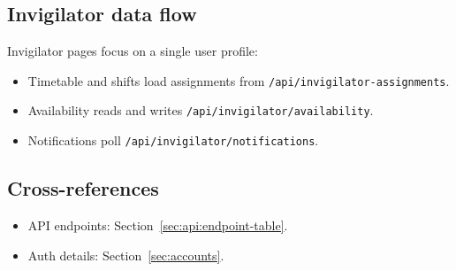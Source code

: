 \subsection{Invigilator data flow}
\label{subsec:frontend:state:invigilator}

Invigilator pages focus on a single user profile:

\begin{itemize}
  \item Timetable and shifts load assignments from \texttt{/api/invigilator-assignments}.
  \item Availability reads and writes \texttt{/api/invigilator/availability}.
  \item Notifications poll \texttt{/api/invigilator/notifications}.
\end{itemize}

\subsection{Cross-references}
\label{subsec:frontend:state:links}

\begin{itemize}
  \item API endpoints: Section~\ref{sec:api:endpoint-table}.
  \item Auth details: Section~\ref{sec:accounts}.
\end{itemize}
